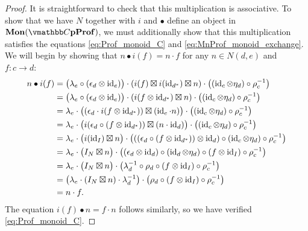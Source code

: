 \documentclass[11pt,oneside,article]{memoir}
\begin{document}
\begin{proof}
   It is straightforward to check that this multiplication is associative. To show that we have $N$
   together with $i$ and $\bullet$ define an object in $\Mon(\dCompProf)$, we must additionally show
   that this multiplication satisfies the equations \eqref{eq:Prof_monoid_C} and
   \eqref{eq:MnProf_monoid_exchange}. We will begin by showing that $n\bullet i(f)=n\cdot f$ for any
   $n\in N(d,e)$ and $f\colon c\to d$:
   \begin{align*}
      n\bullet i(f)
      &= \bigl(\lambda_e\circ(\epsilon_d\otimes\operatorname{id}_e)\bigr)
         \cdot (i(f)\boxtimes i(\operatorname{id}_{d^*})\boxtimes n)
         \cdot \bigl((\operatorname{id}_c\otimes \eta_d)\circ \rho_c^{-1}\bigr) \\
      &= \bigl(\lambda_e\circ(\epsilon_d\otimes\operatorname{id}_e)\bigr)
         \cdot (i(f\otimes\operatorname{id}_{d^*})\boxtimes n)
         \cdot \bigl((\operatorname{id}_c\otimes \eta_d)\circ \rho_c^{-1}\bigr) \\
      &= \lambda_e \cdot \bigl((\epsilon_d\cdot i(f\otimes \operatorname{id}_{d^*}))\boxtimes (\operatorname{id}_e\cdot n)\bigr)
         \cdot \bigl((\operatorname{id}_c\otimes \eta_d)\circ \rho_c^{-1}\bigr) \\
      &= \lambda_e \cdot \bigl(i(\epsilon_d\circ (f\otimes \operatorname{id}_{d^*}))\boxtimes (n\cdot\operatorname{id}_d)\bigr)
         \cdot \bigl((\operatorname{id}_c\otimes \eta_d)\circ \rho_c^{-1}\bigr) \\
      &= \lambda_e \cdot \bigl(i(\operatorname{id}_I)\boxtimes n\bigr)
         \cdot \bigl(((\epsilon_d\circ (f\otimes \operatorname{id}_{d^*}))\otimes\operatorname{id}_d)
            \circ(\operatorname{id}_c\otimes \eta_d)\circ \rho_c^{-1}\bigr) \\
      &= \lambda_e \cdot \bigl(I_N\boxtimes n\bigr)
         \cdot \bigl((\epsilon_d\otimes\operatorname{id}_d)\circ(\operatorname{id}_d\otimes\eta_d)
            \circ(f\otimes\operatorname{id}_I)\circ \rho_c^{-1}\bigr) \\
      &= \lambda_e \cdot \bigl(I_N\boxtimes n\bigr)
         \cdot \bigl(\lambda_d^{-1}\circ \rho_d\circ(f\otimes\operatorname{id}_I)\circ \rho_c^{-1}\bigr) \\
      &= \bigl(\lambda_e\cdot(I_N\boxtimes n)\cdot \lambda_d^{-1}\bigr)
         \cdot \bigl(\rho_d\circ(f\otimes\operatorname{id}_I)\circ \rho_c^{-1}\bigr) \\
      &= n\cdot f.
   \end{align*}
   The equation $i(f)\bullet n=f\cdot n$ follows similarly, so we have verified
   \eqref{eq:Prof_monoid_C}.


\end{proof}
\end{document}
